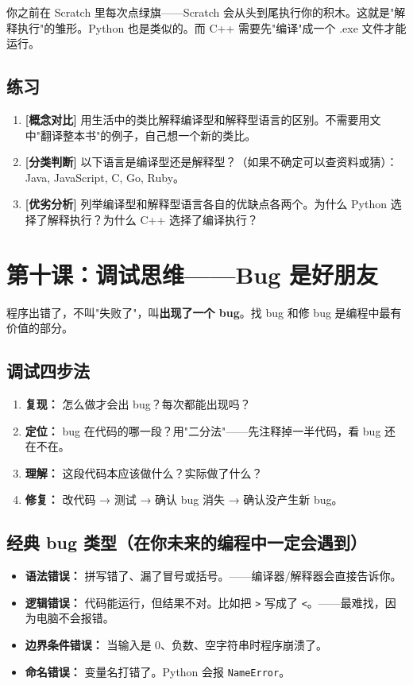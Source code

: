 \documentclass[a4paper,12pt]{ctexart}
\begin{document}
你之前在 Scratch 里每次点绿旗——Scratch 会从头到尾执行你的积木。这就是"解释执行"的雏形。Python 也是类似的。而 C++ 需要先"编译"成一个 .exe 文件才能运行。

\subsection*{练习}

\begin{enumerate}
  \item \textbf{[概念对比]} 用生活中的类比解释编译型和解释型语言的区别。不需要用文中"翻译整本书"的例子，自己想一个新的类比。
  \item \textbf{[分类判断]} 以下语言是编译型还是解释型？（如果不确定可以查资料或猜）：Java, JavaScript, C, Go, Ruby。
  \item \textbf{[优劣分析]} 列举编译型和解释型语言各自的优缺点各两个。为什么 Python 选择了解释执行？为什么 C++ 选择了编译执行？
\end{enumerate}

\section*{第十课：调试思维——Bug 是好朋友}

程序出错了，不叫"失败了"，叫\textbf{出现了一个 bug}。找 bug 和修 bug 是编程中最有价值的部分。

\subsection*{调试四步法}

\begin{enumerate}
  \item \textbf{复现：} 怎么做才会出 bug？每次都能出现吗？
  \item \textbf{定位：} bug 在代码的哪一段？用"二分法"——先注释掉一半代码，看 bug 还在不在。
  \item \textbf{理解：} 这段代码本应该做什么？实际做了什么？
  \item \textbf{修复：} 改代码 → 测试 → 确认 bug 消失 → 确认没产生新 bug。
\end{enumerate}

\subsection*{经典 bug 类型（在你未来的编程中一定会遇到）}

\begin{itemize}
  \item \textbf{语法错误：} 拼写错了、漏了冒号或括号。——编译器/解释器会直接告诉你。
  \item \textbf{逻辑错误：} 代码能运行，但结果不对。比如把 \texttt{>} 写成了 \texttt{<}。——最难找，因为电脑不会报错。
  \item \textbf{边界条件错误：} 当输入是 0、负数、空字符串时程序崩溃了。
  \item \textbf{命名错误：} 变量名打错了。Python 会报 \texttt{NameError}。
\end{itemize}
\end{document}
